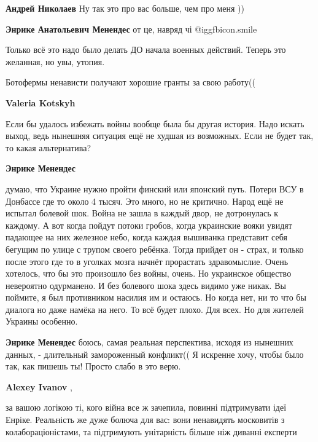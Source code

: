 \begin{itemize}
\begin{itemize} %
\textbf{Андрей Николаев} Ну так это про вас больше, чем про меня ))

\textbf{Энрике Анатольевич Менендес} от це, навряд чі  @igg{fbicon.smile} 

\end{itemize} %


Только всё это надо было делать ДО начала военных действий. Теперь это
желанная, но увы, утопия.

Ботофермы ненависти получают хорошие гранты за свою работу((

\begin{itemize} %
\textbf{Valeria Kotskyh} 

Если бы удалось избежать войны вообще была бы другая история. Надо искать
выход, ведь нынешняя ситуация ещё не худшая из возможных. Если не будет так, то
какая альтернатива?

\textbf{Энрике Менендес} 

думаю, что Украине нужно пройти финский или японский путь. Потери ВСУ в
Донбассе где то около 4 тысяч. Это много, но не критично. Народ ещё не испытал
болевой шок. Война не зашла в каждый двор, не дотронулась к каждому. А вот
когда пойдут потоки гробов, когда украинские вояки увидят падающее на них
железное небо, когда каждая вышиванка представит себя бегущим по улице с трупом
своего ребёнка. Тогда прийдет он - страх, и только после этого где то в уголках
мозга начнёт прорастать здравомыслие. Очень хотелось, что бы это произошло без
войны, очень. Но украинское общество невероятно одурманено. И без болевого шока
здесь видимо уже никак. Вы поймите, я был противником насилия им и остаюсь. Но
когда нет, ни то что бы диалога но даже намёка на него. То всё будет плохо. Для
всех. Но для жителей Украины особенно.

\textbf{Энрике Менендес} боюсь, самая реальная перспектива, исходя из нынешних данных, - длительный замороженный конфликт((
Я искренне хочу, чтобы было так, как пишешь ты! Просто слабо в это верю.

\textbf{Alexey Ivanov} , 

за вашою логікою ті, кого війна все ж зачепила, повинні підтримувати ідеї
Енріке. Реальність же дуже болюча для вас: вони ненавидять московитів з
колабораціоністами, та підтримують унітарність більше ніж диванні експерти



\end{itemize}
\end{itemize}
